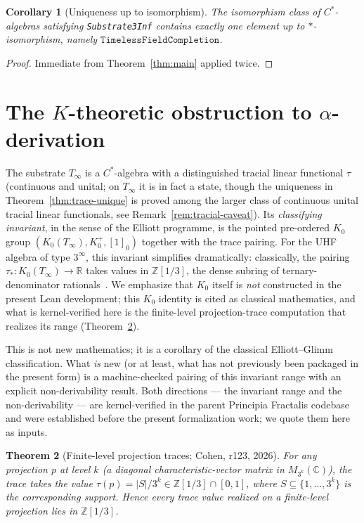 \documentclass[11pt,a4paper]{article}
\theoremstyle{plain}
\newtheorem{theorem}{Theorem}[section]
\newtheorem{corollary}[theorem]{Corollary}
\theoremstyle{definition}
\begin{document}
\begin{corollary}[Uniqueness up to isomorphism]
The isomorphism class of $C^{\ast}$-algebras satisfying \texttt{Substrate3Inf} contains exactly one element up to $\ast$-isomorphism, namely $\texttt{TimelessFieldCompletion}$.
\end{corollary}

\begin{proof}
Immediate from Theorem~\ref{thm:main} applied twice.
\end{proof}

\section{The $K$-theoretic obstruction to $\alpha$-derivation}
\label{sec:obstruction}

The substrate $T_{\infty}$ is a $C^{\ast}$-algebra with a distinguished tracial linear functional $\tau$ (continuous and unital; on $T_{\infty}$ it is in fact a state, though the uniqueness in Theorem~\ref{thm:trace-unique} is proved among the larger class of continuous unital tracial linear functionals, see Remark~\ref{rem:tracial-caveat}). Its \emph{classifying invariant}, in the sense of the Elliott programme, is the pointed pre-ordered $K_0$ group $(K_0(T_{\infty}), K_0^+, [1]_0)$ together with the trace pairing. For the UHF algebra of type $3^{\infty}$, this invariant simplifies dramatically: classically, the pairing $\tau_{\ast}: K_0(T_{\infty}) \to \mathbb{R}$ takes values in $\mathbb{Z}[1/3]$, the dense subring of ternary-denominator rationals~\cite{glimm1960, elliott1976}. We emphasize that $K_0$ itself is \emph{not} constructed in the present Lean development; this $K_0$ identity is cited as classical mathematics, and what is kernel-verified here is the finite-level projection-trace computation that realizes its range (Theorem~\ref{thm:kth-range}).

This is not new mathematics; it is a corollary of the classical Elliott--Glimm classification. What \emph{is} new (or at least, what has not previously been packaged in the present form) is a machine-checked pairing of this invariant range with an explicit non-derivability result. Both directions --- the invariant range and the non-derivability --- are kernel-verified in the parent Principia Fractalis codebase and were established before the present formalization work; we quote them here as inputs.

\begin{theorem}[Finite-level projection traces; Cohen, r123, 2026]
\label{thm:kth-range}
For any projection $p$ at level $k$ (a diagonal characteristic-vector matrix in $M_{3^k}(\mathbb{C})$), the trace takes the value $\tau(p) = |S|/3^k \in \mathbb{Z}[1/3] \cap [0,1]$, where $S \subseteq \{1, \ldots, 3^k\}$ is the corresponding support. Hence every trace value realized on a finite-level projection lies in $\mathbb{Z}[1/3]$.
\end{theorem}
\end{document}
